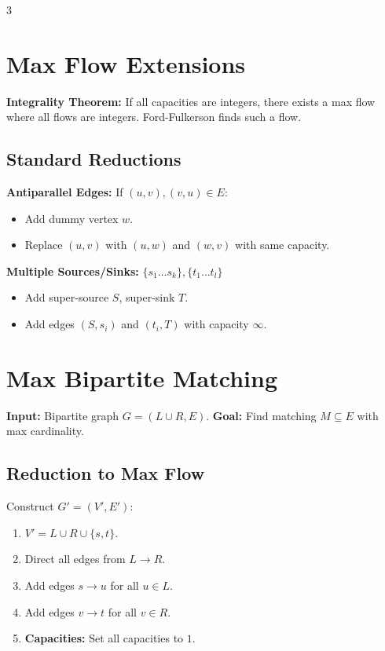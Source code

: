 \documentclass[a4paper,10pt]{article}
\begin{document}
\begin{multicols}{3}
\section{Max Flow Extensions}
\textbf{Integrality Theorem:} If all capacities are integers, there exists a max flow where all flows are integers. Ford-Fulkerson finds such a flow.

\subsection{Standard Reductions}
\textbf{Antiparallel Edges:} If $(u,v), (v,u) \in E$:
\begin{itemize}
    \item Add dummy vertex $w$.
    \item Replace $(u,v)$ with $(u,w)$ and $(w,v)$ with same capacity.
\end{itemize}
\textbf{Multiple Sources/Sinks:} $\{s_1 \dots s_k\}, \{t_1 \dots t_l\}$
\begin{itemize}
    \item Add super-source $S$, super-sink $T$.
    \item Add edges $(S, s_i)$ and $(t_i, T)$ with capacity $\infty$.
\end{itemize}

\section{Max Bipartite Matching}
\textbf{Input:} Bipartite graph $G=(L \cup R, E)$.
\textbf{Goal:} Find matching $M \subseteq E$ with max cardinality.

\subsection{Reduction to Max Flow}
Construct $G' = (V', E')$:
\begin{enumerate}
    \item $V' = L \cup R \cup \{s, t\}$.
    \item Direct all edges from $L \to R$.
    \item Add edges $s \to u$ for all $u \in L$.
    \item Add edges $v \to t$ for all $v \in R$.
    \item \textbf{Capacities:} Set all capacities to $1$.
\end{enumerate}


\end{multicols}
\end{document}
